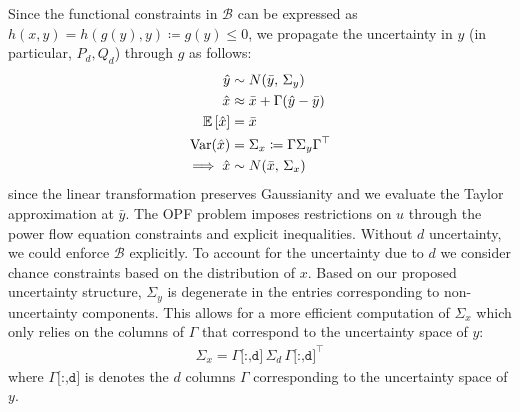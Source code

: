 Since the functional constraints in $\mathcal{B}$ can be expressed as $h(x, y) = h(g(y), y) \coloneqq g(y) \leq 0$, we propagate the uncertainty in $y$ (in particular, $P_d, Q_d$) through $g$ as follows:
\begin{align}
\hat{y} &\sim N(\bar{y},\, \Sigma_y) \\
\hat{x} &\approx \bar{x} + \Gamma (\hat{y} - \bar{y}) \\
\mathbb{E} \left[ \hat{x} \right] &= \bar{x} \\
\text{Var}(\hat{x}) &= \Sigma_x \coloneqq \Gamma \Sigma_y \Gamma^{\top} \\
\implies \hat{x} &\sim N(\bar{x},\, \Sigma_x)
\end{align}
since the linear transformation preserves Gaussianity and we evaluate the Taylor approximation at $\bar{y}$.
The OPF problem imposes restrictions on $u$ through the power flow equation constraints and explicit inequalities.
Without $d$ uncertainty, we could enforce $\mathcal{B}$ explicitly.
To account for the uncertainty due to $d$ we consider chance constraints based on the distribution of $x$.
Based on our proposed uncertainty structure, $\Sigma_y$ is degenerate in the entries corresponding to non-uncertainty components.
This allows for a more efficient computation of $\Sigma_x$ which only relies on the columns of $\Gamma$ that correspond to the uncertainty space of $y$:
\begin{align}
\Sigma_x = \Gamma \texttt{[:,d]} \, \Sigma_d \, \Gamma\texttt{[:,d]}^{\top}
\end{align}
where $\Gamma\texttt{[:,d]}$ is denotes the $d$ columns $\Gamma$ corresponding to the uncertainty space of $y$.

